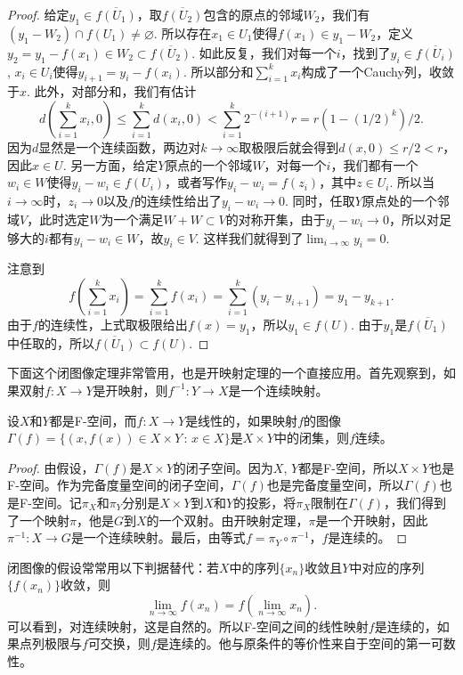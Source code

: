 \begin{proof}
给定$y_1\in \overline{f(U_1)}$，取$\overline{f(U_2)}$包含的原点的邻域$W_2$，我们有$(y_1-W_2)\cap f(U_1)\neq\varnothing$. 所以存在$x_1\in U_1$使得$f(x_1)\in y_1 - W_2$，定义$y_2=y_1-f(x_1)\in W_2\subset \overline{f(U_2)}$. 如此反复，我们对每一个$i$，找到了$y_i\in \overline{f(U_{i})}$, $x_i\in U_i$使得$y_{i+1}=y_{i}-f(x_i)$. 所以部分和$\sum_{i=1}^kx_i$构成了一个Cauchy列，收敛于$x$. 此外，对部分和，我们有估计
\[
	d\left(\sum_{i=1}^kx_i,0\right)\leq \sum_{i=1}^k d(x_{i},0)<\sum_{i=1}^k 2^{-(i+1)}r=r(1-(1/2)^k)/2.
\]
因为$d$显然是一个连续函数，两边对$k\to \infty$取极限后就会得到$d(x,0)\leq r/2<r$，因此$x\in U$. 另一方面，给定$Y$原点的一个邻域$W$，对每一个$i$，我们都有一个$w_i\in W$使得$y_i-w_i\in f(U_{i})$，或者写作$y_i-w_i=f(z_i)$，其中$z\in U_i$. 所以当$i\to \infty$时，$z_i\to 0$以及$f$的连续性给出了$y_i-w_i\to 0$. 同时，任取$Y$原点处的一个邻域$V$，此时选定$W$为一个满足$W+W\subset V$的对称开集，由于$y_i-w_i\to 0$，所以对足够大的$i$都有$y_i-w_i\in W$，故$y_i\in V$. 这样我们就得到了$\lim_{i\to\infty}y_i=0$.

注意到
\[
	f\left(\sum_{i=1}^kx_i\right)=\sum_{i=1}^kf(x_i)=\sum_{i=1}^k(y_i-y_{i+1})=y_1-y_{k+1}.
\]
由于$f$的连续性，上式取极限给出$f(x)=y_1$，所以$y_1\in f(U)$. 由于$y_1$是$\overline{f(U_1)}$中任取的，所以$\overline{f(U_1)}\subset f(U)$.
\end{proof}

下面这个闭图像定理非常管用，也是开映射定理的一个直接应用。首先观察到，如果双射$f:X\to Y$是开映射，则$f^{-1}:Y\to X$是一个连续映射。

\begin{thm}[闭图像定理]
设$X$和$Y$都是F-空间，而$f:X\to Y$是线性的，如果映射$f$的图像$\Gamma(f)=\{(x,f(x))\in X\times Y\,:\, x\in X\}$是$X\times Y$中的闭集，则$f$连续。
\end{thm}

\begin{proof}
	由假设，$\Gamma(f)$是$X\times Y$的闭子空间。因为$X$, $Y$都是F-空间，所以$X\times Y$也是F-空间。作为完备度量空间的闭子空间，$\Gamma(f)$也是完备度量空间，所以$\Gamma(f)$也是F-空间。记$\pi_X$和$\pi_Y$分别是$X\times Y$到$X$和$Y$的投影，将$\pi_X$限制在$\Gamma(f)$，我们得到了一个映射$\pi$，他是$G$到$X$的一个双射。由开映射定理，$\pi$是一个开映射，因此$\pi^{-1}:X\to G$是一个连续映射。最后，由等式$f=\pi_Y\circ \pi^{-1}$，$f$是连续的。
\end{proof}

闭图像的假设常常用以下判据替代：若$X$中的序列$\{x_n\}$收敛且$Y$中对应的序列$\{f(x_n)\}$收敛，则
\[
	\lim_{n\to \infty}f(x_n)=f\left(\lim_{n\to \infty} x_n\right).
\]
可以看到，对连续映射，这是自然的。所以F-空间之间的线性映射$f$是连续的，如果点列极限与$f$可交换，则$f$是连续的。他与原条件的等价性来自于空间的第一可数性。

